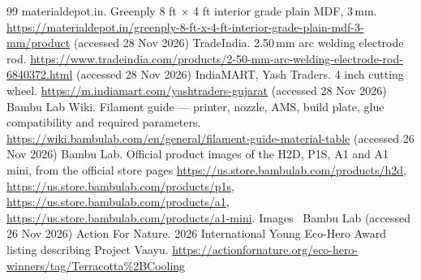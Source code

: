 \documentclass[11pt,a4paper]{report}
\begin{document}
\begin{thebibliography}{99}
 materialdepot.in. Greenply 8 ft $\times$ 4 ft interior grade plain MDF, 3\,mm. \url{https://materialdepot.in/greenply-8-ft-x-4-ft-interior-grade-plain-mdf-3-mm/product} (accessed 28 Nov 2026)
 TradeIndia. 2.50\,mm arc welding electrode rod. \url{https://www.tradeindia.com/products/2-50-mm-arc-welding-electrode-rod-6840372.html} (accessed 28 Nov 2026)
 IndiaMART, Yash Traders. 4 inch cutting wheel. \url{https://m.indiamart.com/yashtraders-gujarat} (accessed 28 Nov 2026)
 Bambu Lab Wiki. Filament guide --- printer, nozzle, AMS, build plate, glue compatibility and required parameters. \url{https://wiki.bambulab.com/en/general/filament-guide-material-table} (accessed 26 Nov 2026)
 Bambu Lab. Official product images of the H2D, P1S, A1 and A1 mini, from the official store pages \url{https://us.store.bambulab.com/products/h2d}, \url{https://us.store.bambulab.com/products/p1s}, \url{https://us.store.bambulab.com/products/a1}, \url{https://us.store.bambulab.com/products/a1-mini}. Images \textcopyright\ Bambu Lab (accessed 26 Nov 2026)
 Action For Nature. 2026 International Young Eco-Hero Award listing describing Project Vaayu. \url{https://actionfornature.org/eco-hero-winners/tag/Terracotta%2BCooling}
\end{thebibliography}
\end{document}
